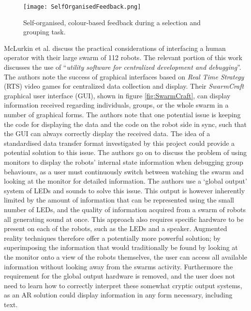 \begin{figure}
 \begin{center}
 \texttt{[image: SelfOrganisedFeedback.png]}
 \decoRule
 \caption[Self Organised Feedback. \cite{Podevijn:2012}]{Self-organised, colour-based feedback during a selection and grouping task. \cite{Podevijn:2012}}
 \label{fig:SelfOrganisedFeedback}
 \end{center}
\end{figure}

McLurkin et al. \cite{McLurkin:2006} discuss the practical considerations of interfacing a human operator with their large swarm of 112 robots. The relevant portion of this work discusses the use of ``\textit{utility software for centralized development and debugging}''. The authors note the success of graphical interfaces based on \textit{Real Time Strategy} (RTS) video games for centralized data collection and display. Their \textit{SwarmCraft} graphical user interface (GUI), shown in figure \ref{fig:SwarmCraft}, can display information received regarding individuals, groups, or the whole swarm in a number of graphical forms. The authors note that one potential issue is keeping the code for displaying the data and the code on the robot side in sync, such that the GUI can always correctly display the received data. The idea of a standardised data transfer format investigated by this project could provide a potential solution to this issue. The authors go on to discuss the problem of using monitors to display the robots' internal state information when debugging group behaviours, as a user must continuously switch between watching the swarm and looking at the monitor for detailed information. The authors use a `global output' system of LEDs and sounds to solve this issue. This output is however inherently limited by the amount of information that can be represented using the small number of LEDs, and the quality of information acquired from a swarm of robots all generating sound at once. This approach also requires specific hardware to be present on each of the robots, such as the LEDs and a speaker. Augmented reality techniques therefore offer a potentially more powerful solution; by superimposing the information that would traditionally be found by looking at the monitor onto a view of the robots themselves, the user can access all available information without looking away from the swarms activity. Furthermore the requirement for the global output hardware is removed, and the user does not need to learn how to correctly interpret these somewhat cryptic output systems, as an AR solution could display information in any form necessary, including text.

